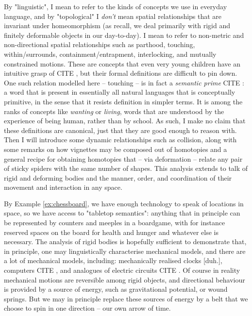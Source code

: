 By "linguistic", I mean to refer to the kinds of concepts we use in everyday language, and by "topological" I \emph{don't} mean spatial relationships that are invariant under homeomorphism (as recall, we deal primarily with rigid and finitely deformable objects in our day-to-day). I mean to refer to non-metric and non-directional spatial relationships such as parthood, touching, within/surrounds, containment/entrapment, interlocking, and mutually constrained motions. These are concepts that even very young children have an intuitive grasp of \bR CITE \e, but their formal definitions are difficult to pin down. One such relation modelled here -- touching -- is in fact a \emph{semantic prime} \bR CITE \e: a word that is present in essentially all natural languages that is conceptually primitive, in the sense that it resists definition in simpler terms. It is among the ranks of concepts like \emph{wanting} or \emph{living}, words that are understood by the experience of being human, rather than by school. As such, I make no claim that these definitions are canonical, just that they are good enough to reason with. Then I will introduce some dynamic relationships such as collision, along with some remarks on how vignettes may be composed out of homotopies and a general recipe for obtaining homotopies that -- via deformation -- relate any pair of sticky spiders with the same number of shapes. This analysis extends to talk of rigid and deforming bodies and the manner, order, and coordination of their movement and interaction in any space.

 By Example \ref{ex:chessboard}, we have enough technology to speak of locations in space, so we have access to "tabletop semantics": anything that in principle can be represented by counters and meeples in a boardgame, with for instance reserved spaces on the board for health and hunger and whatever else is necessary. The analysis of rigid bodies is hopefully sufficient to demonstrate that, in principle, one may linguistically characterise mechanical models, and there are a lot of mechanical models, including: mechanically realised clocks [duh.], computers \bR CITE \e, and analogues of electric circuits \bR CITE \e. Of course in reality mechanical motions are reversible among rigid objects, and directional behaviour is provided by a source of energy, such as gravitational potential, or wound springs. But we may in principle replace these sources of energy by a belt that we choose to spin in one direction -- our own arrow of time.

